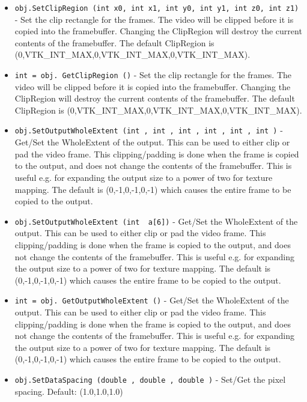 \begin{itemize}
\item  \verb|obj.SetClipRegion (int x0, int x1, int y0, int y1, int z0, int z1)| -  Set the clip rectangle for the frames.  The video will be clipped 
 before it is copied into the framebuffer.  Changing the ClipRegion
 will destroy the current contents of the framebuffer.
 The default ClipRegion is (0,VTK\_INT\_MAX,0,VTK\_INT\_MAX,0,VTK\_INT\_MAX).

\item  \verb|int = obj. GetClipRegion ()| -  Set the clip rectangle for the frames.  The video will be clipped 
 before it is copied into the framebuffer.  Changing the ClipRegion
 will destroy the current contents of the framebuffer.
 The default ClipRegion is (0,VTK\_INT\_MAX,0,VTK\_INT\_MAX,0,VTK\_INT\_MAX).

\item  \verb|obj.SetOutputWholeExtent (int , int , int , int , int , int )| -  Get/Set the WholeExtent of the output.  This can be used to either
 clip or pad the video frame.  This clipping/padding is done when
 the frame is copied to the output, and does not change the contents
 of the framebuffer.  This is useful e.g. for expanding 
 the output size to a power of two for texture mapping.  The
 default is (0,-1,0,-1,0,-1) which causes the entire frame to be
 copied to the output.

\item  \verb|obj.SetOutputWholeExtent (int  a[6])| -  Get/Set the WholeExtent of the output.  This can be used to either
 clip or pad the video frame.  This clipping/padding is done when
 the frame is copied to the output, and does not change the contents
 of the framebuffer.  This is useful e.g. for expanding 
 the output size to a power of two for texture mapping.  The
 default is (0,-1,0,-1,0,-1) which causes the entire frame to be
 copied to the output.

\item  \verb|int = obj. GetOutputWholeExtent ()| -  Get/Set the WholeExtent of the output.  This can be used to either
 clip or pad the video frame.  This clipping/padding is done when
 the frame is copied to the output, and does not change the contents
 of the framebuffer.  This is useful e.g. for expanding 
 the output size to a power of two for texture mapping.  The
 default is (0,-1,0,-1,0,-1) which causes the entire frame to be
 copied to the output.

\item  \verb|obj.SetDataSpacing (double , double , double )| -  Set/Get the pixel spacing. 
 Default: (1.0,1.0,1.0)


\end{itemize}
